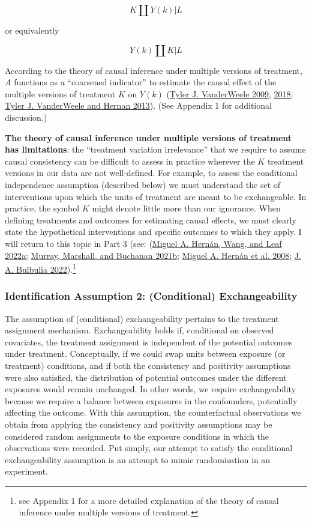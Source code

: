 \documentclass[
  singlecolumn]{article}
\begin{document}
\[
K \coprod Y(k) | L
\]

or equivalently

\[
Y(k) \coprod K | L
\]

According to the theory of causal inference under multiple versions of
treatment, \(A\) functions as a ``coarsened indicator'' to estimate the
causal effect of the multiple versions of treatment \(K\) on \(Y(k)\)
(\protect\hyperlink{ref-vanderweele2009}{Tyler J. VanderWeele 2009},
\protect\hyperlink{ref-vanderweele2018}{2018};
\protect\hyperlink{ref-vanderweele2013}{Tyler J. VanderWeele and Hernan
2013}). (See Appendix 1 for additional discussion.)

\textbf{The theory of causal inference under multiple versions of
treatment has limitations}: the ``treatment variation irrelevance'' that
we require to assume causal consistency can be difficult to assess in
practice wherever the \(K\) treatment versions in our data are not
well-defined. For example, to assess the conditional independence
assumption (described below) we must understand the set of interventions
upon which the units of treatment are meant to be exchangeable. In
practice, the symbol \(K\) m️ight denote little more than our ignorance.
When defining treatments and outcomes for estimating causal effects, we
must clearly state the hypothetical interventions and specific outcomes
to which they apply. I will return to this topic in Part 3 (see:
(\protect\hyperlink{ref-hernuxe1n2022a}{Miguel A. Hernán, Wang, and Leaf
2022a}; \protect\hyperlink{ref-murray2021a}{Murray, Marshall, and
Buchanan 2021b}; \protect\hyperlink{ref-hernuxe1n2008}{Miguel A. Hernán
et al. 2008}; \protect\hyperlink{ref-bulbulia2022}{J. A. Bulbulia
2022}).\footnote{see Appendix 1 for a more detailed explanation of the
  theory of causal inference under multiple versions of treatment.}

\hypertarget{identification-assumption-2-conditional-exchangeability}{%
\subsubsection{Identification Assumption 2: (Conditional)
Exchangeability}\label{identification-assumption-2-conditional-exchangeability}}

The assumption of (conditional) exchangeability pertains to the
treatment assignment mechanism. Exchangeability holds if, conditional on
observed covariates, the treatment assignment is independent of the
potential outcomes under treatment. Conceptually, if we could swap units
between exposure (or treatment) conditions, and if both the consistency
and positivity assumptions were also satisfied, the distribution of
potential outcomes under the different exposures would remain unchanged.
In other words, we require exchangeability because we require a balance
between exposures in the confounders, potentially affecting the outcome.
With this assumption, the counterfactual observations we obtain from
applying the consistency and positivity assumptions may be considered
random assignments to the exposure conditions in which the observations
were recorded. Put simply, our attempt to satisfy the conditional
exchangeability assumption is an attempt to mimic randomisation in an
experiment.
\end{document}
